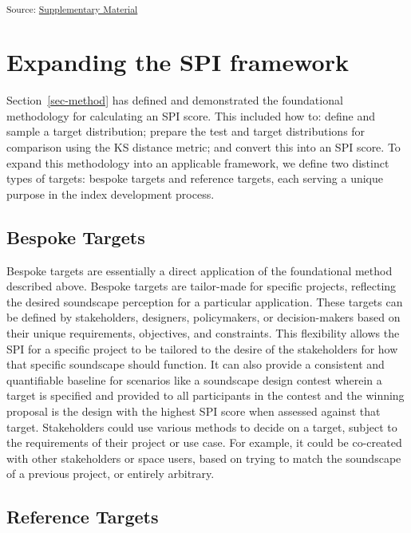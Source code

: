 \documentclass[
  authoryear,
  preprint,
  1p]{elsarticle}
\begin{document}
\textsubscript{Source:
\href{https://MitchellAcoustics.github.io/J2401_JASA_SSID-Single-Index/notebooks/SingleIndex-Code-preview.html\#cell-tbl-ex-spis}{Supplementary
Material }}

\section{Expanding the SPI framework}\label{expanding-the-spi-framework}

Section~\ref{sec-method} has defined and demonstrated the foundational
methodology for calculating an SPI score. This included how to: define
and sample a target distribution; prepare the test and target
distributions for comparison using the KS distance metric; and convert
this into an SPI score. To expand this methodology into an applicable
framework, we define two distinct types of targets: bespoke targets and
reference targets, each serving a unique purpose in the index
development process.

\subsection{Bespoke Targets}\label{bespoke-targets}

Bespoke targets are essentially a direct application of the foundational
method described above. Bespoke targets are tailor-made for specific
projects, reflecting the desired soundscape perception for a particular
application. These targets can be defined by stakeholders, designers,
policymakers, or decision-makers based on their unique requirements,
objectives, and constraints. This flexibility allows the SPI for a
specific project to be tailored to the desire of the stakeholders for
how that specific soundscape should function. It can also provide a
consistent and quantifiable baseline for scenarios like a soundscape
design contest wherein a target is specified and provided to all
participants in the contest and the winning proposal is the design with
the highest SPI score when assessed against that target. Stakeholders
could use various methods to decide on a target, subject to the
requirements of their project or use case. For example, it could be
co-created with other stakeholders or space users, based on trying to
match the soundscape of a previous project, or entirely arbitrary.

\subsection{Reference Targets}\label{reference-targets}
\end{document}

